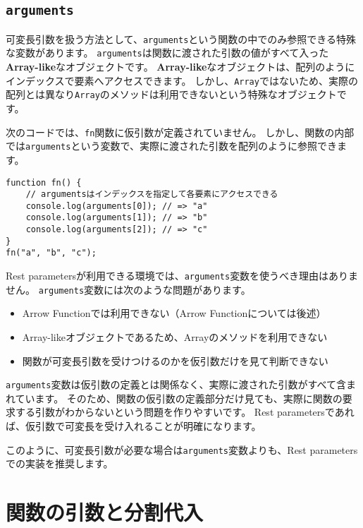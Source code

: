 \hypertarget{arguments}{%
\subsection{\texorpdfstring{\texttt{arguments}}{arguments}}\label{arguments}}

可変長引数を扱う方法として、\texttt{arguments}という関数の中でのみ参照できる特殊な変数があります。
\texttt{arguments}は関数に渡された引数の値がすべて入った\textbf{Array-like}なオブジェクトです。
\textbf{Array-like}なオブジェクトは、配列のようにインデックスで要素へアクセスできます。
しかし、\texttt{Array}ではないため、実際の配列とは異なり\texttt{Array}のメソッドは利用できないという特殊なオブジェクトです。

次のコードでは、\texttt{fn}関数に仮引数が定義されていません。
しかし、関数の内部では\texttt{arguments}という変数で、実際に渡された引数を配列のように参照できます。
\newpage
\begin{lstlisting}
function fn() {
    // argumentsはインデックスを指定して各要素にアクセスできる
    console.log(arguments[0]); // => "a" 
    console.log(arguments[1]); // => "b" 
    console.log(arguments[2]); // => "c" 
}
fn("a", "b", "c");
\end{lstlisting}

Rest
parametersが利用できる環境では、\texttt{arguments}変数を使うべき理由はありません。
\texttt{arguments}変数には次のような問題があります。

\begin{itemize}
\item
  Arrow Functionでは利用できない（Arrow Functionについては後述）
\item
  Array-likeオブジェクトであるため、Arrayのメソッドを利用できない
\item
  関数が可変長引数を受けつけるのかを仮引数だけを見て判断できない
\end{itemize}

\texttt{arguments}変数は仮引数の定義とは関係なく、実際に渡された引数がすべて含まれています。
そのため、関数の仮引数の定義部分だけ見ても、実際に関数の要求する引数がわからないという問題を作りやすいです。
Rest parametersであれば、仮引数で可変長を受け入れることが明確になります。

このように、可変長引数が必要な場合は\texttt{arguments}変数よりも、Rest
parametersでの実装を推奨します。

\hypertarget{function-destructuring}{%
\section[関数の引数と分割代入]{関数の引数と分割代入\,\protect{}}\label{function-destructuring}}

